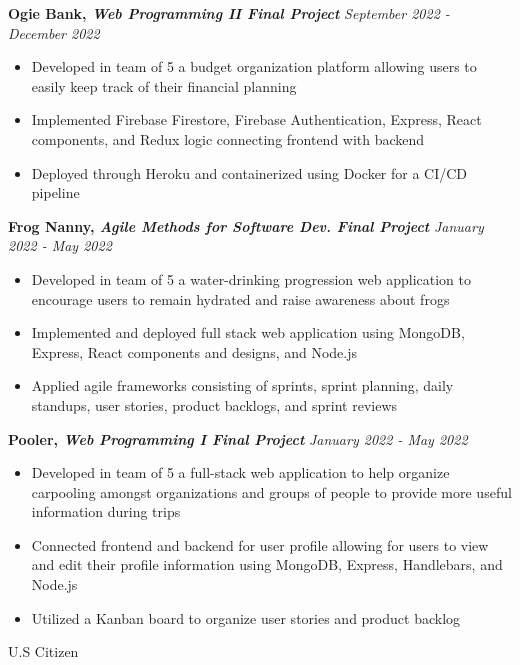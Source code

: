 \documentclass[10pt]{article}
\begin{document}
\textbf{Ogie Bank, \textit{Web Programming II Final Project}} \hfill \textit{September 2022 - December 2022}
\begin{itemize}[noitemsep, topsep=0.5pt, parsep=0pt,partopsep=0pt]
    \item Developed in team of 5 a budget organization platform allowing users to easily keep track of their financial planning
    \item Implemented Firebase Firestore, Firebase Authentication, Express, React components, and Redux logic connecting frontend with backend
    \item Deployed through Heroku and containerized using Docker for a CI/CD pipeline
\end{itemize}

\textbf{Frog Nanny, \textit{Agile Methods for Software Dev. Final Project}}  \hfill \textit{January 2022 - May 2022}
\begin{itemize}[noitemsep, topsep=0.5pt, parsep=0pt,partopsep=0pt]
    \item Developed in team of 5 a water-drinking progression web application to encourage users to remain hydrated and raise awareness about frogs
    \item Implemented and deployed  full stack web application using MongoDB, Express, React components and designs, and Node.js
    \item Applied agile frameworks consisting of sprints, sprint planning, daily standups, user stories, product backlogs, and sprint reviews
\end{itemize}

\textbf{Pooler, \textit{Web Programming I Final Project}} \hfill \textit{January 2022 - May 2022}
\begin{itemize}[noitemsep, topsep=0.5pt, parsep=0pt,partopsep=0pt]
    \item Developed in team of 5 a full-stack web application to help organize carpooling amongst organizations and groups of people to provide more useful information during trips
    \item Connected frontend and backend for user profile allowing for  users to view and edit their profile information using MongoDB, Express, Handlebars, and Node.js
    \item Utilized a Kanban board to organize user stories and product backlog
\end{itemize}

\vspace{2mm}
\begin{center}
    U.S Citizen
\end{center}
\end{document}
